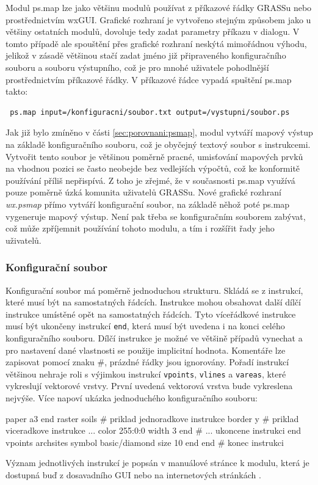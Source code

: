 \documentclass[a4paper,12pt,draft]{article}
\newcommand{\instr}[1]{\lstinline[style=psmapInline]|#1|}
\begin{document}
{Modul ps.map lze jako většinu modulů používat z příkazové
řádky GRASSu nebo pro\-střed\-nic\-tvím wxGUI. Grafické rozhraní
je vytvořeno stejným způsobem jako u většiny ostatních modulů,
dovoluje tedy zadat parametry příkazu v dialogu. V tomto případě ale
spouštění přes grafické rozhraní neskýtá mimořádnou výhodu,
jelikož v zásadě většinou stačí zadat jméno již připraveného
konfiguračního souboru a souboru výstupního, což je pro mnohé uživatele
pohodlnější prostřednictvím příkazové řádky. V příkazové řádce
vypadá spuštění ps.map takto:
\begin{verbatim}
 ps.map input=/konfiguracni/soubor.txt output=/vystupni/soubor.ps
\end{verbatim}

Jak již bylo zmíněno v části \ref{sec:porovnani:psmap}, modul vytváří
mapový výstup na základě konfiguračního souboru, což je obyčejný
textový soubor s instrukcemi. Vytvořit tento soubor je většinou poměrně
pracné, umisťování mapových prvků na vhodnou pozici se často neobejde
bez vedlejších výpočtů, což ke konformitě používání příliš
nepřispívá. Z toho je zřejmé, že v současnosti ps.map využívá
pouze poměrně úzká komunita uživatelů GRASSu. Nové grafické rozhraní
\emph{wx.psmap} přímo vytváří konfigurační soubor, na základě
něhož poté ps.map vygeneruje mapový výstup. Není pak třeba
se konfiguračním souborem zabývat, což může zpříjemnit používání
tohoto modulu, a tím i rozšířit řady jeho uživatelů.

\subsubsection{Konfigurační soubor}
Konfigurační soubor má poměrně jednoduchou strukturu. Skládá se z
instrukcí, které musí být na samostatných řádcích. Instrukce mohou
obsahovat další dílčí instrukce umístěné opět na samostatných
řádcích. Tyto víceřádkové instrukce musí být ukončeny  instrukcí
\instr{end}, která musí být uvedena i na konci celého konfiguračního
souboru. Dílčí instrukce je možné ve většině případů vynechat a
pro nastavení dané vlastnosti se použije implicitní hodnota. Komentáře
lze zapisovat pomocí znaku \#, prázdné řádky jsou ignorovány. Pořadí
instrukcí většinou nehraje roli s výjimkou instrukcí \instr{vpoints},
\instr{vlines} a \instr{vareas}, které vykreslují vektorové vrstvy. První
uvedená vektorová vrstva bude vykreslena nejvýše. Více napoví ukázka
jednoduchého konfiguračního souboru:
\begin{psmap}
paper a3
end
raster soils            # priklad jednoradkove instrukce
border y                # priklad viceradkove instrukce ...
   color 255:0:0
   width 3
end                     # ... ukoncene instrukci end
vpoints archsites
   symbol basic/diamond
   size 10
end
end                     # konec instrukci
\end{psmap}
Význam jednotlivých instrukcí je popsán v manuálové stránce k modulu,
která je dostupná buď z dosavadního GUI nebo na internetových stránkách
\cite{manual}.

}
\end{document}
